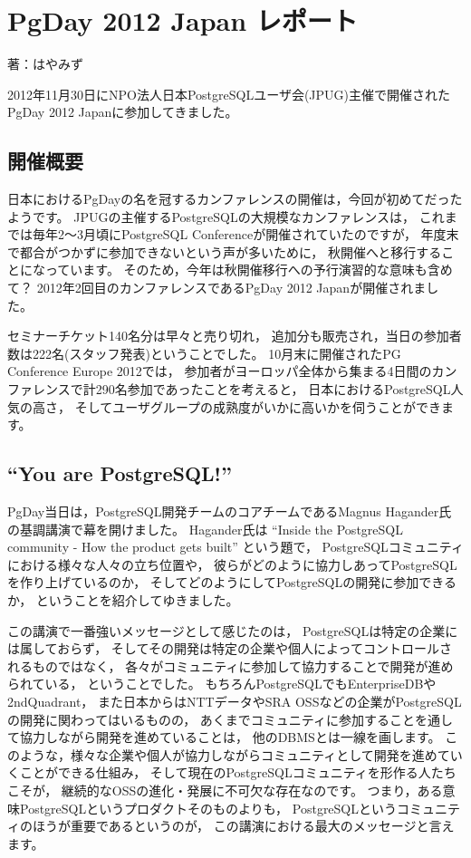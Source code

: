 
\chapter{PgDay 2012 Japan レポート}

\begin{flushright}
 {\headfont 著：はやみず}
\end{flushright}

2012年11月30日にNPO法人日本PostgreSQLユーザ会(JPUG)主催で開催されたPgDay 2012 Japanに参加してきました。

\section{開催概要}

日本におけるPgDayの名を冠するカンファレンスの開催は，今回が初めてだったようです。
JPUGの主催するPostgreSQLの大規模なカンファレンスは，
これまでは毎年2〜3月頃にPostgreSQL Conferenceが開催されていたのですが，
年度末で都合がつかずに参加できないという声が多いために，
秋開催へと移行することになっています。
そのため，今年は秋開催移行への予行演習的な意味も含めて？
2012年2回目のカンファレンスであるPgDay 2012 Japanが開催されました。

セミナーチケット140名分は早々と売り切れ，
追加分も販売され，当日の参加者数は222名(スタッフ発表)ということでした。
10月末に開催されたPG Conference Europe 2012では，
参加者がヨーロッパ全体から集まる4日間のカンファレンスで計290名参加であったことを考えると，
日本におけるPostgreSQL人気の高さ，
そしてユーザグループの成熟度がいかに高いかを伺うことができます。

\section{``You are PostgreSQL!''}

PgDay当日は，PostgreSQL開発チームのコアチームであるMagnus Hagander氏の基調講演で幕を開けました。
Hagander氏は ``Inside the PostgreSQL community - How the product gets built'' という題で，
PostgreSQLコミュニティにおける様々な人々の立ち位置や，
彼らがどのように協力しあってPostgreSQLを作り上げているのか，
そしてどのようにしてPostgreSQLの開発に参加できるか，
ということを紹介してゆきました。

この講演で一番強いメッセージとして感じたのは，
PostgreSQLは特定の企業には属しておらず，
そしてその開発は特定の企業や個人によってコントロールされるものではなく，
各々がコミュニティに参加して協力することで開発が進められている，
ということでした。
もちろんPostgreSQLでもEnterpriseDBや2ndQuadrant，
また日本からはNTTデータやSRA OSSなどの企業がPostgreSQLの開発に関わってはいるものの，
あくまでコミュニティに参加することを通して協力しながら開発を進めていることは，
他のDBMSとは一線を画します。
このような，様々な企業や個人が協力しながらコミュニティとして開発を進めていくことができる仕組み，
そして現在のPostgreSQLコミュニティを形作る人たちこそが，
継続的なOSSの進化・発展に不可欠な存在なのです。
つまり，ある意味PostgreSQLというプロダクトそのものよりも，
PostgreSQLというコミュニティのほうが重要であるというのが，
この講演における最大のメッセージと言えます。

